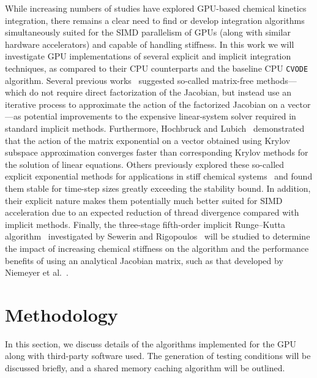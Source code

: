 \documentclass[preprint]{elsarticle}
\begin{document}
While increasing numbers of studies have explored GPU-based chemical kinetics integration, there remains a clear need to find or develop integration algorithms simultaneously suited for the SIMD parallelism of GPUs (along with similar hardware accelerators) and capable of handling stiffness.
In this work we will investigate GPU implementations of several explicit and implicit integration techniques, as compared to their CPU counterparts and the baseline CPU \texttt{CVODE}~\cite{Hindmarsh:2005hg} algorithm.
Several previous works~\cite{Perini20141180,McNenly2015581} suggested so-called matrix-free methods---which do not require direct factorization of the Jacobian, but instead use an iterative process to approximate the action of the factorized Jacobian on a vector---as potential improvements to the expensive linear-system solver required in standard implicit methods.
Furthermore, Hochbruck and Lubich~\cite{Hochbruck:1997} demonstrated that the action of the matrix exponential on a vector obtained using Krylov subspace approximation converges faster than corresponding Krylov methods for the solution of linear equations.
Others previously explored these so-called explicit exponential methods for applications in stiff chemical systems~\cite{Bisetti:2012jw,falati2011integration} and found them stable for time-step sizes greatly exceeding the stability bound.
In addition, their explicit nature makes them potentially much better suited for SIMD acceleration due to an expected reduction of thread divergence compared with implicit methods.
Finally, the three-stage fifth-order implicit Runge--Kutta algorithm~\cite{wanner1991solving} investigated by Sewerin and Rigopoulos~\cite{Sewerin20151375} will be studied to determine the impact of increasing chemical stiffness on the algorithm and the performance benefits of using an analytical Jacobian matrix, such as that developed by Niemeyer et al.~\cite{Niemeyer:2015im,Niemeyer:2015ws}.

\section{Methodology}
\label{sec:Method}

In this section, we discuss details of the algorithms implemented for the GPU along with third-party software used.
The generation of testing conditions will be discussed briefly, and a shared memory caching algorithm will be outlined.
\end{document}
